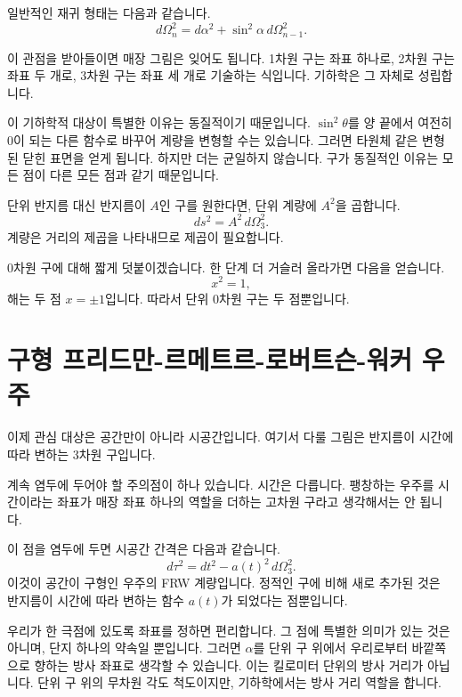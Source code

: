 일반적인 재귀 형태는 다음과 같습니다.
\begin{equation}
d\Omega_n^2=d\alpha^2+\sin^2\alpha\,d\Omega_{n-1}^2.
\end{equation}

이 관점을 받아들이면 매장 그림은 잊어도 됩니다. 1차원 구는 좌표 하나로, 2차원 구는 좌표 두 개로, 3차원 구는 좌표 세 개로 기술하는 식입니다. 기하학은 그 자체로 성립합니다.

이 기하학적 대상이 특별한 이유는 동질적이기 때문입니다. \(\sin^2\theta\)를 양 끝에서 여전히 0이 되는 다른 함수로 바꾸어 계량을 변형할 수는 있습니다. 그러면 타원체 같은 변형된 닫힌 표면을 얻게 됩니다. 하지만 더는 균일하지 않습니다. 구가 동질적인 이유는 모든 점이 다른 모든 점과 같기 때문입니다.

단위 반지름 대신 반지름이 \(A\)인 구를 원한다면, 단위 계량에 \(A^2\)을 곱합니다.
\begin{equation}
ds^2=A^2\,d\Omega_3^2.
\end{equation}
계량은 거리의 제곱을 나타내므로 제곱이 필요합니다.

0차원 구에 대해 짧게 덧붙이겠습니다. 한 단계 더 거슬러 올라가면 다음을 얻습니다.
\begin{equation}
x^2=1,
\end{equation}
해는 두 점 \(x=\pm 1\)입니다. 따라서 단위 0차원 구는 두 점뿐입니다.

\section{구형 프리드만-르메트르-로버트슨-워커 우주}

이제 관심 대상은 공간만이 아니라 시공간입니다. 여기서 다룰 그림은 반지름이 시간에 따라 변하는 3차원 구입니다.

계속 염두에 두어야 할 주의점이 하나 있습니다. 시간은 다릅니다. 팽창하는 우주를 시간이라는 좌표가 매장 좌표 하나의 역할을 더하는 고차원 구라고 생각해서는 안 됩니다.

이 점을 염두에 두면 시공간 간격은 다음과 같습니다.
\begin{equation}
d\tau^2=dt^2-a(t)^2\,d\Omega_3^2.
\end{equation}
이것이 공간이 구형인 우주의 FRW 계량입니다. 정적인 구에 비해 새로 추가된 것은 반지름이 시간에 따라 변하는 함수 \(a(t)\)가 되었다는 점뿐입니다.

우리가 한 극점에 있도록 좌표를 정하면 편리합니다. 그 점에 특별한 의미가 있는 것은 아니며, 단지 하나의 약속일 뿐입니다. 그러면 \(\alpha\)를 단위 구 위에서 우리로부터 바깥쪽으로 향하는 방사 좌표로 생각할 수 있습니다. 이는 킬로미터 단위의 방사 거리가 아닙니다. 단위 구 위의 무차원 각도 척도이지만, 기하학에서는 방사 거리 역할을 합니다.

